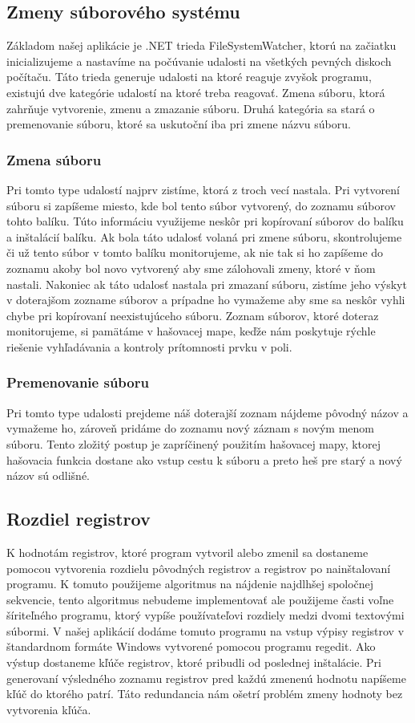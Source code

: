 \subsection{Zmeny súborového systému}
\label{subsec:fsw}
Základom našej aplikácie je .NET trieda FileSystemWatcher, ktorú na začiatku inicializujeme a nastavíme na počúvanie udalosti na všetkých pevných diskoch počítaču. Táto trieda generuje udalosti na ktoré reaguje zvyšok programu, existujú dve kategórie udalostí na ktoré treba reagovať. Zmena súboru, ktorá zahrňuje vytvorenie, zmenu a zmazanie súboru. Druhá kategória sa stará o premenovanie súboru, ktoré sa uskutoční iba pri zmene názvu súboru. 

\subsubsection{Zmena súboru}
Pri tomto type udalostí najprv zistíme, ktorá z troch vecí nastala. Pri vytvorení súboru si zapíšeme miesto, kde bol tento súbor vytvorený, do zoznamu súborov tohto balíku. Túto informáciu využijeme neskôr pri kopírovaní súborov do balíku a inštalácií balíku. Ak bola táto udalosť volaná pri zmene súboru, skontrolujeme či už tento súbor v tomto balíku monitorujeme, ak nie tak si ho zapíšeme do zoznamu akoby bol novo vytvorený aby sme zálohovali zmeny, ktoré v ňom nastali. Nakoniec ak táto udalosť nastala pri zmazaní súboru, zistíme jeho výskyt v doterajšom zozname súborov a prípadne ho vymažeme aby sme sa neskôr vyhli chybe pri kopírovaní neexistujúceho súboru. Zoznam súborov, ktoré doteraz monitorujeme, si pamätáme v hašovacej mape, keďže nám poskytuje rýchle riešenie vyhľadávania a kontroly prítomnosti prvku v poli.

\subsubsection{Premenovanie súboru}
Pri tomto type udalosti prejdeme náš doterajší zoznam nájdeme pôvodný názov a vymažeme ho, zároveň pridáme do zoznamu nový záznam s novým menom súboru. Tento zložitý postup je zapríčinený použitím hašovacej mapy, ktorej hašovacia funkcia dostane ako vstup cestu k súboru a preto heš pre starý a nový názov sú odlišné.

\subsection{Rozdiel registrov}
K hodnotám registrov, ktoré program vytvoril alebo zmenil sa dostaneme pomocou vytvorenia rozdielu pôvodných registrov a registrov po nainštalovaní programu. K tomuto použijeme algoritmus na nájdenie najdlhšej spoločnej sekvencie, tento algoritmus nebudeme implementovať ale použijeme časti voľne šíriteľného programu, ktorý vypíše používateľovi rozdiely medzi dvomi textovými súbormi. V našej aplikácií dodáme tomuto programu na vstup výpisy registrov v štandardnom formáte Windows vytvorené pomocou programu regedit. Ako výstup dostaneme kľúče registrov, ktoré pribudli od poslednej inštalácie. Pri generovaní výsledného zoznamu registrov pred každú zmenenú hodnotu napíšeme kľúč do ktorého patrí. Táto redundancia nám ošetrí problém zmeny hodnoty bez vytvorenia kľúča.


